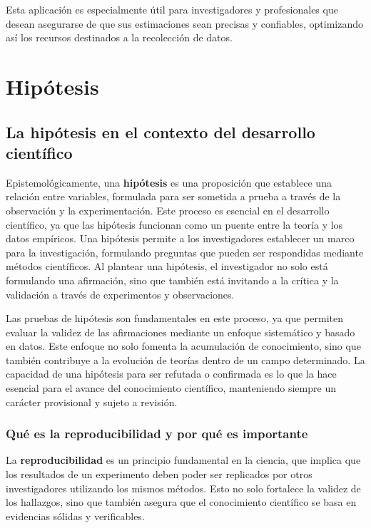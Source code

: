 \documentclass[
  letterpaper,
  DIV=11,
  numbers=noendperiod]{scrreprt}
\begin{document}
Esta aplicación es especialmente útil para investigadores y
profesionales que desean asegurarse de que sus estimaciones sean
precisas y confiables, optimizando así los recursos destinados a la
recolección de datos.

\chapter{Hipótesis}\label{hipuxf3tesis}

\section{La hipótesis en el contexto del desarrollo
científico}\label{la-hipuxf3tesis-en-el-contexto-del-desarrollo-cientuxedfico}

Epistemológicamente, una \textbf{hipótesis} es una proposición que
establece una relación entre variables, formulada para ser sometida a
prueba a través de la observación y la experimentación. Este proceso es
esencial en el desarrollo científico, ya que las hipótesis funcionan
como un puente entre la teoría y los datos empíricos. Una hipótesis
permite a los investigadores establecer un marco para la investigación,
formulando preguntas que pueden ser respondidas mediante métodos
científicos. Al plantear una hipótesis, el investigador no solo está
formulando una afirmación, sino que también está invitando a la crítica
y la validación a través de experimentos y observaciones.

Las pruebas de hipótesis son fundamentales en este proceso, ya que
permiten evaluar la validez de las afirmaciones mediante un enfoque
sistemático y basado en datos. Este enfoque no solo fomenta la
acumulación de conocimiento, sino que también contribuye a la evolución
de teorías dentro de un campo determinado. La capacidad de una hipótesis
para ser refutada o confirmada es lo que la hace esencial para el avance
del conocimiento científico, manteniendo siempre un carácter provisional
y sujeto a revisión.

\subsection{Qué es la reproducibilidad y por qué es
importante}\label{quuxe9-es-la-reproducibilidad-y-por-quuxe9-es-importante}

La \textbf{reproducibilidad} es un principio fundamental en la ciencia,
que implica que los resultados de un experimento deben poder ser
replicados por otros investigadores utilizando los mismos métodos. Esto
no solo fortalece la validez de los hallazgos, sino que también asegura
que el conocimiento científico se basa en evidencias sólidas y
verificables.
\end{document}
